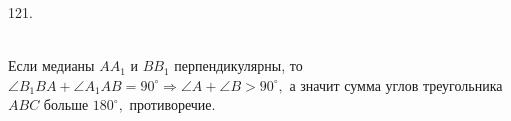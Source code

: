 121. \begin{figure}[ht!]
\end{figure}\\
Если медианы $AA_1$ и $BB_1$ перпендикулярны, то $\angle B_1BA+\angle A_1AB=90^\circ\Rightarrow\angle A+\angle B>90^\circ,$ а значит сумма углов треугольника $ABC$ больше $180^\circ,$ противоречие.\\
